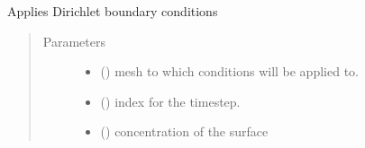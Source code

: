 \documentclass[letterpaper,10pt,english]{sphinxmanual}
\begin{document}
\begin{fulllineitems}
\label{\detokenize{solver:solver.apply_dirichlet_bc}}
\sphinxAtStartPar
Applies Dirichlet boundary conditions
\begin{quote}\begin{description}
\item[{Parameters}] \leavevmode\begin{itemize}
\item {} 
\sphinxAtStartPar
{} (\sphinxstyleliteralemphasis{\sphinxupquote{{[}}}\sphinxstyleliteralemphasis{\sphinxupquote{{]}}}) \textendash{} mesh to which conditions will be applied to.

\item {} 
\sphinxAtStartPar
{} (\sphinxstyleliteralemphasis{\sphinxupquote{{[}}}\sphinxstyleliteralemphasis{\sphinxupquote{{]}}}) \textendash{} index for the timestep.

\item {} 
\sphinxAtStartPar
{} (\sphinxstyleliteralemphasis{\sphinxupquote{{[}}}\sphinxstyleliteralemphasis{\sphinxupquote{{]}}}) \textendash{} concentration of the surface

\end{itemize}

\end{description}\end{quote}

\end{fulllineitems}

\end{document}

